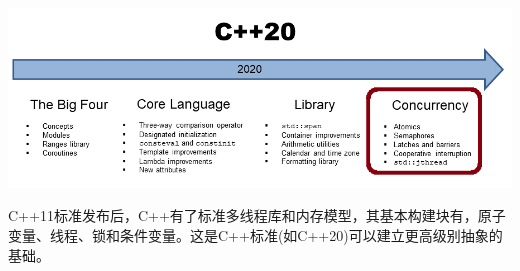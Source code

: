 \begin{center}
\includegraphics[width=1.0\textwidth]{content/3/chapter6/images/1.png}\\
\end{center}

C++11标准发布后，C++有了标准多线程库和内存模型，其基本构建块有，原子变量、线程、锁和条件变量。这是C++标准(如C++20)可以建立更高级别抽象的基础。